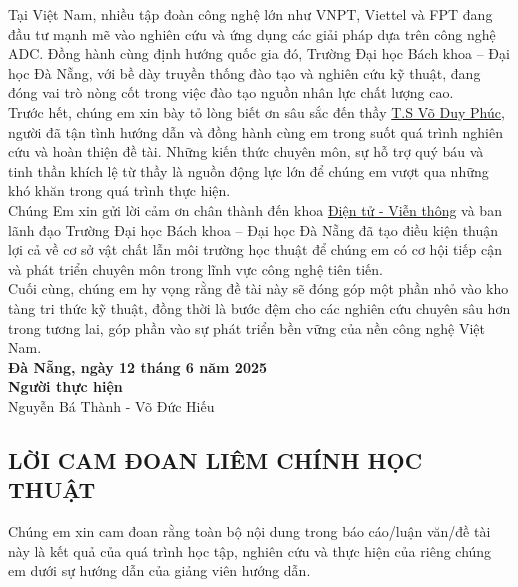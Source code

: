\documentclass[a4paper,13pt]{article}
\begin{document}
Tại Việt Nam, nhiều tập đoàn công nghệ lớn như VNPT, Viettel và FPT đang đầu tư mạnh mẽ vào nghiên cứu và ứng dụng các giải pháp dựa trên công nghệ ADC. Đồng hành cùng định hướng quốc gia đó, Trường Đại học Bách khoa – Đại học Đà Nẵng, với bề dày truyền thống đào tạo và nghiên cứu kỹ thuật, đang đóng vai trò nòng cốt trong việc đào tạo nguồn nhân lực chất lượng cao.\\

Trước hết, chúng em xin bày tỏ lòng biết ơn sâu sắc đến thầy \href{https://scv.udn.vn/vdphuc}{T.S Võ Duy Phúc}, người đã tận tình hướng dẫn và đồng hành cùng em trong suốt quá trình nghiên cứu và hoàn thiện đề tài. Những kiến thức chuyên môn, sự hỗ trợ quý báu và tinh thần khích lệ từ thầy là nguồn động lực lớn để chúng em vượt qua những khó khăn trong quá trình thực hiện.\\

Chúng Em xin gửi lời cảm ơn chân thành đến khoa \href{http://ete.dut.udn.vn/}{Điện tử - Viễn thông} và ban lãnh đạo Trường Đại học Bách khoa – Đại học Đà Nẵng đã tạo điều kiện thuận lợi cả về cơ sở vật chất lẫn môi trường học thuật để chúng em có cơ hội tiếp cận và phát triển chuyên môn trong lĩnh vực công nghệ tiên tiến.\\

Cuối cùng, chúng em hy vọng rằng đề tài này sẽ đóng góp một phần nhỏ vào kho tàng tri thức kỹ thuật, đồng thời là bước đệm cho các nghiên cứu chuyên sâu hơn trong tương lai, góp phần vào sự phát triển bền vững của nền công nghệ Việt Nam.\\

\textbf{\hspace{7cm} Đà Nẵng, ngày 12 tháng 6 năm 2025}\\

\textbf{\hspace{9cm} Người thực hiện}\\

\hspace{7cm} Nguyễn Bá Thành - Võ Đức Hiếu \\
\clearpage  
\begin{center}
\section{LỜI CAM ĐOAN LIÊM CHÍNH HỌC THUẬT}
\end{center}

Chúng em xin cam đoan rằng toàn bộ nội dung trong báo cáo/luận văn/đề tài này là kết quả của quá trình học tập, nghiên cứu và thực hiện của riêng chúng em dưới sự hướng dẫn của giảng viên hướng dẫn.\\
\end{document}
